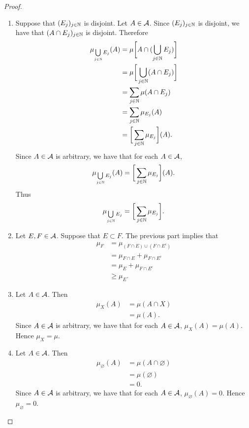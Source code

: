 \documentclass{book}
\begin{document}
	\begin{proof}\
		\begin{enumerate}
			\item Suppose that $(E_j)_{j \in \mathbb{N}}$ is disjoint. Let $A \in \mathcal{A}$. Since $(E_j)_{j \in \mathbb{N}}$ is disjoint, we have that $(A \cap E_j)_{j \in \mathbb{N}}$ is disjoint. Therefore
			\begin{align*}
				\mu_{\bigcup\limits_{j \in \mathbb{N}} E_j}(A)
				& = \mu \bigg[ A \cap (\bigcup_{j \in \mathbb{N}} E_j) \bigg] \\
				& = \mu \bigg[ \bigcup_{j \in \mathbb{N}}(A \cap E_j) \bigg] \\
				& = \sum\limits_{j \in \mathbb{N}} \mu(A \cap E_j) \\
				& = \sum\limits_{j \in \mathbb{N}} \mu_{E_j}(A) \\
				& = \bigg[ \sum\limits_{j \in \mathbb{N}} \mu_{E_j} \bigg](A).
			\end{align*}
			Since $A \in \mathcal{A}$ is arbitrary, we have that for each $A \in \mathcal{A}$, 
			$$\mu_{\bigcup\limits_{j \in \mathbb{N}} E_j}(A) = \bigg[ \sum\limits_{j \in \mathbb{N}} \mu_{E_j} \bigg](A).$$
			Thus 
			$$\mu_{\bigcup\limits_{j \in \mathbb{N}} E_j} = \bigg[ \sum\limits_{j \in \mathbb{N}} \mu_{E_j} \bigg].$$
			\item Let $E, F \in \mathcal{A}$. Suppose that $E \subset F$. The previous part implies that
			\begin{align*}
				\mu_F
				& = \mu_{(F \cap E) \cup (F \cap E^c)} \\
				& = \mu_{F \cap E} + \mu_{F \cap E^c} \\
				& = \mu_E + \mu_{F \cap E^c} \\
				& \geq \mu_E.
			\end{align*}
			\item Let $A \in \mathcal{A}$. Then 
			\begin{align*}
				\mu_X(A)
				& = \mu(A \cap X) \\
				& = \mu(A).
			\end{align*}
			Since $A \in \mathcal{A}$ is arbitrary, we have that for each $A \in \mathcal{A}$, $\mu_X(A) = \mu(A)$. Hence $\mu_X = \mu$.
			\item Let $A \in \mathcal{A}$. Then 
			\begin{align*}
				\mu_{\varnothing}(A)
				& = \mu(A \cap \varnothing) \\
				& = \mu(\varnothing) \\
				& = 0.
			\end{align*}
			Since $A \in \mathcal{A}$ is arbitrary, we have that for each $A \in \mathcal{A}$, $\mu_{\varnothing}(A) = 0$. Hence $\mu_{\varnothing} = 0$.
		\end{enumerate}
	\end{proof}
\end{document}
